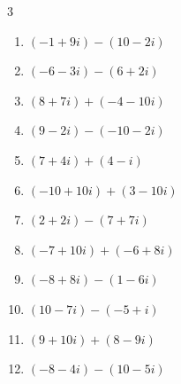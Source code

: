 


\setcounter{quesnum}{57}

\begin{multicols}{3}
\begin{enumerate}
  \itemsep=1pt
  \item $\displaystyle (-1+9i) - (10-2i)$

        \phantom{$\displaystyle =-11+11i$}

  \item $\displaystyle (-6-3i) - (6+2i)$

        \phantom{$\displaystyle =-12-5i$}

  \item $\displaystyle (8+7i) + (-4-10i)$

        \phantom{$\displaystyle =4-3i$}

  \item $\displaystyle (9-2i) - (-10-2i)$

        \phantom{$\displaystyle =19$}

  \item $\displaystyle (7+4i) + (4-i)$

        \phantom{$\displaystyle =11+3i$}

  \item $\displaystyle (-10+10i) + (3-10i)$

        \phantom{$\displaystyle =-7$}

  \item $\displaystyle (2+2i) - (7+7i)$

        \phantom{$\displaystyle =-5-5i$}

  \item $\displaystyle (-7+10i) + (-6+8i)$

        \phantom{$\displaystyle =-13+18i$}

  \item $\displaystyle (-8+8i) - (1-6i)$

        \phantom{$\displaystyle =-9+14i$}

  \item $\displaystyle (10-7i) - (-5+i)$

        \phantom{$\displaystyle =15-8i$}

  \item $\displaystyle (9+10i) + (8-9i)$

        \phantom{$\displaystyle =17+i$}

  \item $\displaystyle (-8-4i) - (10-5i)$


\end{enumerate}
\end{multicols}
